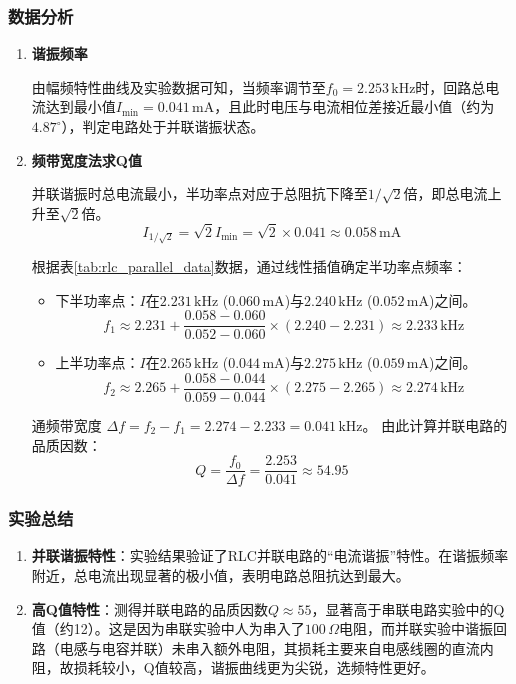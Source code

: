 \documentclass[11pt]{article}
\begin{document}
\subsubsection{数据分析}
\begin{enumerate}
    \item \textbf{谐振频率}
    
    由幅频特性曲线及实验数据可知，当频率调节至$f_0=2.253\,\text{kHz}$时，回路总电流达到最小值$I_{\min}=0.041\,\text{mA}$，且此时电压与电流相位差接近最小值（约为$4.87^\circ$），判定电路处于并联谐振状态。

    \item \textbf{频带宽度法求Q值}
    
    并联谐振时总电流最小，半功率点对应于总阻抗下降至$1/\sqrt{2}$倍，即总电流上升至$\sqrt{2}$倍。
    \[ I_{1/\sqrt{2}} = \sqrt{2} I_{\min} = \sqrt{2} \times 0.041 \approx 0.058\,\text{mA} \]
    
    根据表\ref{tab:rlc_parallel_data}数据，通过线性插值确定半功率点频率：
    \begin{itemize}
        \item 下半功率点：$I$在$2.231\,\text{kHz}$ ($0.060\,\text{mA}$)与$2.240\,\text{kHz}$ ($0.052\,\text{mA}$)之间。
        \[ f_1 \approx 2.231 + \frac{0.058 - 0.060}{0.052 - 0.060} \times (2.240 - 2.231) \approx 2.233\,\text{kHz} \]
        \item 上半功率点：$I$在$2.265\,\text{kHz}$ ($0.044\,\text{mA}$)与$2.275\,\text{kHz}$ ($0.059\,\text{mA}$)之间。
        \[ f_2 \approx 2.265 + \frac{0.058 - 0.044}{0.059 - 0.044} \times (2.275 - 2.265) \approx 2.274\,\text{kHz} \]
    \end{itemize}
    
    通频带宽度 $\Delta f = f_2 - f_1 = 2.274 - 2.233 = 0.041\,\text{kHz}$。
    由此计算并联电路的品质因数：
    \[ Q = \frac{f_0}{\Delta f} = \frac{2.253}{0.041} \approx 54.95 \]
\end{enumerate}

\subsubsection{实验总结}
\begin{enumerate}
    \item \textbf{并联谐振特性}：实验结果验证了RLC并联电路的“电流谐振”特性。在谐振频率附近，总电流出现显著的极小值，表明电路总阻抗达到最大。
    
    \item \textbf{高Q值特性}：测得并联电路的品质因数$Q \approx 55$，显著高于串联电路实验中的Q值（约12）。这是因为串联实验中人为串入了$100\,\Omega$电阻，而并联实验中谐振回路（电感与电容并联）未串入额外电阻，其损耗主要来自电感线圈的直流内阻，故损耗较小，Q值较高，谐振曲线更为尖锐，选频特性更好。
\end{enumerate}
\end{document}
